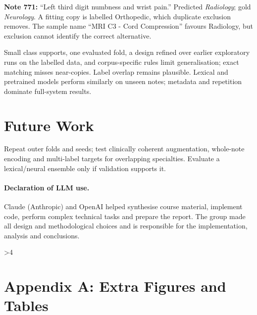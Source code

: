 \documentclass[twocolumn,10pt]{article}
\begin{document}
\textbf{Note 771:} ``Left third digit numbness and wrist pain.'' Predicted \emph{Radiology}; gold \emph{Neurology}. A fitting copy is labelled Orthopedic, which duplicate exclusion removes. The sample name ``MRI C3 - Cord Compression'' favours Radiology, but exclusion cannot identify the correct alternative.

Small class supports, one evaluated fold, a design refined over earlier exploratory runs on the labelled data, and corpus-specific rules limit generalisation; exact matching misses near-copies. Label overlap remains plausible. Lexical and pretrained models perform similarly on unseen notes; metadata and repetition dominate full-system results.

\section{Future Work}
Repeat outer folds and seeds; test clinically coherent augmentation, whole-note encoding and multi-label targets for overlapping specialties. Evaluate a lexical/neural ensemble only if validation supports it.

\paragraph{Declaration of LLM use.}
Claude (Anthropic) and OpenAI helped synthesise course material, implement code, perform complex technical tasks and prepare the report. The group made all design and methodological choices and is responsible for the implementation, analysis and conclusions.

\clearpage
\ifnum\value{page}>4 \fi



\clearpage
\onecolumn
{}
\setcounter{appendixstart}{\value{page}}
\appendix
\section*{Appendix A: Extra Figures and Tables}
\end{document}
